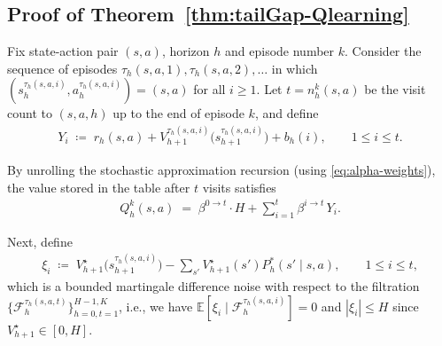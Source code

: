 \documentclass[11pt]{article}
\newcommand{\E} {\mathbb{E}}
\newcommand{\lr}{\beta}
\begin{document}
\subsection{Proof of Theorem~\ref{thm:tailGap-Qlearning}}
Fix state-action pair $(s,a)$, horizon $h$ and episode number $k$. Consider the sequence of episodes $\tau_h(s,a,1),\tau_h(s,a,2),\dots$ in which
$(s_h^{\tau_h(s,a,i)},a_h^{\tau_h(s,a,i)})=(s,a)$ for all $i\geq 1$.
Let $t=n_h^k(s,a)$ be the visit count to $(s,a,h)$ up to the end of episode $k$, and define
\begin{align*}
Y_i \;\coloneqq\; r_h(s,a) + V_{h+1}^{\tau_h(s,a,i)}\!\Big(s_{h+1}^{\tau_h(s,a,i)}\Big) + b_h(i),
\qquad 1\le i\le t.
\end{align*}

By unrolling the stochastic approximation recursion (using \eqref{eq:alpha-weights}),
the value stored in the table after $t$ visits satisfies
\begin{align}
Q_h^k(s,a)
\;=\;
\lr^{0\rightarrow t}\cdot H + \sum_{i=1}^t \lr^{i\rightarrow t} \, Y_i.
\label{eq:unroll-Q}
\end{align}

Next, define 
\begin{align*}
\xi_i
\;\coloneqq\;
V_{h+1}^\star\!\Big(s_{h+1}^{\tau_h(s,a,i)}\Big)
-\sum_{s'}V_{h+1}^\star(s') P_h^*(s'\mid s,a),
\qquad 1\le i\le t,
\end{align*}
which is a bounded martingale difference noise with respect to the filtration $\{\mathcal{F}^{\tau_h(s,a,t)}_h\}_{h=0,t=1}^{H-1,K}$, i.e., we have $\E[\xi_i\mid \mathcal{F}^{\tau_h(s,a,i)}_h]=0$ and
$|\xi_i|\le H$ since $V_{h+1}^\star\in[0,H]$.
\end{document}
